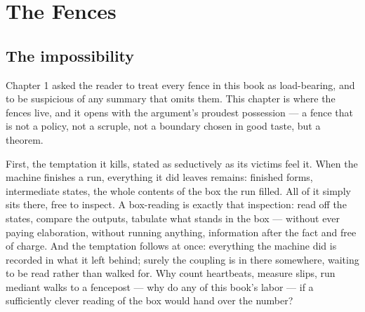 \chapter{The Fences}

\section{The impossibility}

Chapter 1 asked the reader to treat every fence in this book as load-bearing, and to
be suspicious of any summary that omits them. This chapter is where the fences live,
and it opens with the argument's proudest possession --- a fence that is not a
policy, not a scruple, not a boundary chosen in good taste, but a theorem.

First, the temptation it kills, stated as seductively as its victims feel it. When
the machine finishes a run, everything it did leaves remains: finished forms,
intermediate states, the whole contents of the box the run filled. All of it simply
sits there, free to inspect. A box-reading is exactly that inspection: read off the
states, compare the outputs, tabulate what stands in the box --- without ever paying
elaboration, without running anything, information after the fact and free of
charge. And the temptation follows at once: everything the machine did is recorded
in what it left behind; surely the coupling is in there somewhere, waiting to be
read rather than walked for. Why count heartbeats, measure slips, run mediant walks
to a fencepost --- why do any of this book's labor --- if a sufficiently clever
reading of the box would hand over the number?

